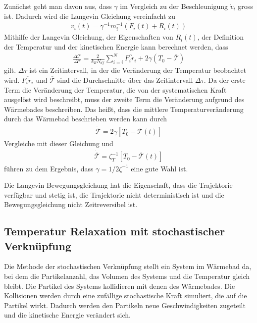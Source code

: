 \documentclass[]{article}
\begin{document}
Zunächst geht man davon aus, dass $\gamma$ im Vergleich zu der Beschleunigung $\dot{v}_i$ gross ist. Dadurch wird die Langevin Gleichung vereinfacht zu 
\begin{align*}
	v_i(t) = \gamma^{-1} m_i^{-1} (F_i(t) + R_i(t) )
\end{align*}
Mithilfe der Langevin Gleichung, der Eigenschaften von $R_i(t)$, der Definition der Temperatur und der kinetischen Energie kann berechnet werden, dass 
\begin{align*}
	\frac{\Delta \mathcal{T}}{\Delta \tau} = \frac{2}{k_B N_{df}} \sum\limits_{i=i}^N \overline{F_i \dot{r}_i} + 2 \gamma (T_0 - \overline{\mathcal{T}})  
\end{align*} 
gilt. $\Delta \tau$ ist ein Zeitintervall, in der die Veränderung der Temperatur beobachtet wird. $\overline{F_i \dot{r}_i} $ und $\overline{\mathcal{T}}$ sind die Durchschnitte über das Zeitintervall $\Delta \tau$. Da der erste Term die Veränderung der Temperatur, die von der systematischen Kraft ausgelöst wird beschreibt, muss der zweite Term die Veränderung aufgrund des Wärmebades beschreiben. 
Das heißt, dass die mittlere Temperaturveränderung durch das Wärmebad beschrieben werden kann durch
\begin{align*}
	\dot{ \overline{\mathcal{T}} } = 2 \gamma [T_0 - \overline{\mathcal{T}}(t)]  
\end{align*}
Vergleiche mit dieser Gleichung und 
\begin{align*}
 \dot{ \overline{\mathcal{T}} } = \zeta_T^{-1} [T_0 - \overline{\mathcal{T}}(t)] 
\end{align*}
führen zu dem Ergebnis, dass $\gamma = 1/2 \zeta^{-1}$ eine gute Wahl ist. 

Die Langevin Bewegungsgleichung hat  die Eigenschaft, dass die Trajektorie verfügbar und stetig ist, die Trajektorie nicht deterministisch ist und die Bewegungsgleichung nicht Zeitreversibel ist. %


\subsection{Temperatur Relaxation mit stochastischer Verknüpfung}

Die Methode der stochastischen Verknüpfung stellt ein System im Wärmebad da, bei dem die Partikelanzahl, das Volumen des Systems und die Temperatur gleich bleibt. Die Partikel des Systems kollidieren mit denen des Wärmebades. Die Kollisionen werden durch eine zufällige stochastische Kraft simuliert, die auf die Partikel wirkt. Dadurch werden den Partikeln neue Geschwindigkeiten zugeteilt und die kinetische Energie verändert sich. 
\end{document}
